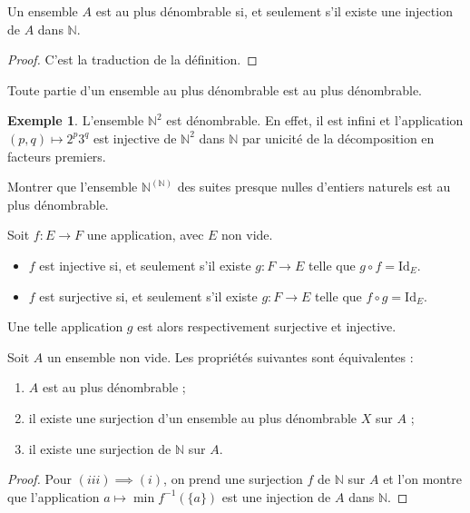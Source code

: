 \documentclass[french]{article}
\newcommand{\N}{\mathbb{N}}
\newcommand{\inv}{^{-1}}
\theoremstyle{plain}
\theoremstyle{definition}
\newtheorem*{ex}{Exemple}
\theoremstyle{remark}
\begin{document}
\begin{prop}%
	Un ensemble $A$ est au plus dénombrable si, et seulement s'il existe une injection de $A$ dans $\N$.
\end{prop}
\begin{proof}
	C'est la traduction de la définition.
\end{proof}

\begin{cor}%
	Toute partie d'un ensemble au plus dénombrable est au plus dénombrable.
\end{cor}

\begin{ex}
	L'ensemble $\N^2$ est dénombrable. En effet, il est infini et l'application $(p,q)\mapsto 2^p3^q$ est injective de $\N^2$ dans $\N$ par unicité de la décomposition en facteurs premiers.
\end{ex}

\begin{exo}
	Montrer que l'ensemble $\N^{(\N)}$ des suites presque nulles d'entiers naturels est au plus dénombrable.
\end{exo}

\begin{lem}%
	Soit $f:E\to F$ une application, avec $E$ non vide.
	\begin{itemize}
		\item $f$ est injective si, et seulement s'il existe $g:F\to E$ telle que $g\circ f=\text{Id}_E$.
		\item $f$ est surjective si, et seulement s'il existe $g:F\to E$ telle que $f\circ g=\text{Id}_E$.
	\end{itemize}
	Une telle application $g$ est alors respectivement surjective et injective.
\end{lem}%

\begin{prop}%
	Soit $A$ un ensemble non vide. Les propriétés suivantes sont équivalentes :
	\begin{enumerate}[label=(\roman*)]
		\item $A$ est au plus dénombrable ;
		\item il existe une surjection d'un ensemble au plus dénombrable $X$ sur $A$ ;
		\item il existe une surjection de $\N$ sur $A$.
	\end{enumerate}
\end{prop}
\begin{proof}
	Pour $(iii)\implies(i)$, on prend une surjection $f$ de $\N$ sur $A$ et l'on montre que l'application $a\mapsto\min f\inv(\{a\})$ est une injection de $A$ dans $\N$.
\end{proof}
\end{document}
